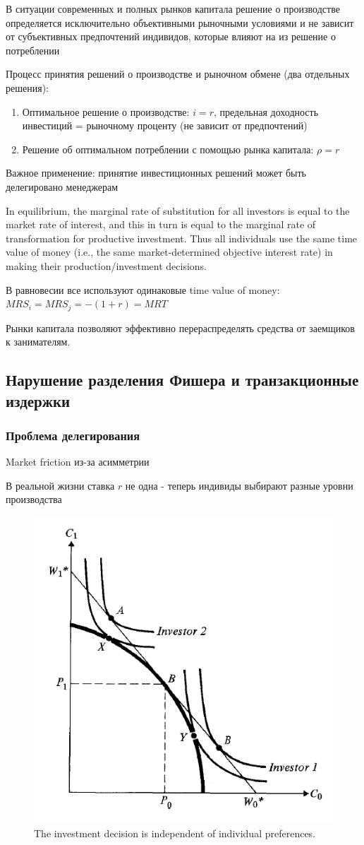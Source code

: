 \documentclass[a4paper,12pt]{article} %
\begin{document}
В ситуации современных и полных рынков капитала решение о производстве определяется исключительно объективными рыночными условиями и не зависит от субъективных предпочтений   индивидов, которые влияют на из решение о потреблении

Процесс принятия решений о производстве и рыночном обмене (два отдельных решения):

\begin{enumerate}
	\item Оптимальное решение о производстве: $ i = r $, предельная доходность инвестиций  = рыночному проценту (не зависит от предпочтений)
	\item Решение об оптимальном потреблении с помощью рынка капитала: $ \rho = r $ 
\end{enumerate}


 Важное применение:   принятие инвестиционных решений может быть делегировано менеджерам
 
 In equilibrium, the marginal rate of substitution for all investors is equal to the
 market rate of interest, and this in turn is equal to the marginal rate of transformation
 for productive investment. Thus all individuals use the same time value of money (i.e., the same market-determined
 objective interest rate) in making their production/investment decisions.
 
 В равновесии  все используют одинаковые time value of money: $ MRS_i = MRS_j = -(1+r) = MRT $ 

  Рынки капитала позволяют эффективно перераспределять средства от заемщиков к занимателям. 
    
 \subsection{ Нарушение разделения Фишера и транзакционные издержки}
  
  \subsubsection{Проблема делегирования}
  
    Market friction из-за асимметрии 
  
  В реальной жизни ставка $ r $ не одна -   теперь индивиды выбирают разные уровни производства 
    
  \begin{figure}[h!]
  	\centering
  	\includegraphics[width=0.4\linewidth]{screenshot005}
  	\caption{The investment decision is independent of individual preferences.}
  	\label{fig:screenshot005}
  \end{figure}
  
\end{document}
